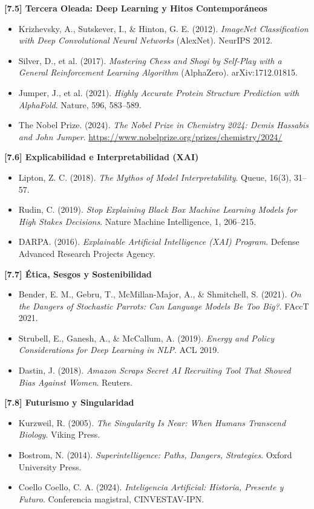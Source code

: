 \documentclass[12pt,a4paper]{report}
\numberwithin{figure}{section}
\begin{document}
\textbf{[7.5] Tercera Oleada: Deep Learning y Hitos Contemporáneos}
\begin{itemize}
  \item Krizhevsky, A., Sutskever, I., \& Hinton, G. E. (2012). \textit{ImageNet Classification with Deep Convolutional Neural Networks} (AlexNet). NeurIPS 2012.
  \item Silver, D., et al. (2017). \textit{Mastering Chess and Shogi by Self-Play with a General Reinforcement Learning Algorithm} (AlphaZero). arXiv:1712.01815.
  \item Jumper, J., et al. (2021). \textit{Highly Accurate Protein Structure Prediction with AlphaFold}. Nature, 596, 583--589.
  \item The Nobel Prize. (2024). \textit{The Nobel Prize in Chemistry 2024: Demis Hassabis and John Jumper}. \url{https://www.nobelprize.org/prizes/chemistry/2024/}
\end{itemize}

\textbf{[7.6] Explicabilidad e Interpretabilidad (XAI)}
\begin{itemize}
  \item Lipton, Z. C. (2018). \textit{The Mythos of Model Interpretability}. Queue, 16(3), 31--57.
  \item Rudin, C. (2019). \textit{Stop Explaining Black Box Machine Learning Models for High Stakes Decisions}. Nature Machine Intelligence, 1, 206--215.
  \item DARPA. (2016). \textit{Explainable Artificial Intelligence (XAI) Program}. Defense Advanced Research Projects Agency.
\end{itemize}

\textbf{[7.7] Ética, Sesgos y Sostenibilidad}
\begin{itemize}
  \item Bender, E. M., Gebru, T., McMillan-Major, A., \& Shmitchell, S. (2021). \textit{On the Dangers of Stochastic Parrots: Can Language Models Be Too Big?}. FAccT 2021.
  \item Strubell, E., Ganesh, A., \& McCallum, A. (2019). \textit{Energy and Policy Considerations for Deep Learning in NLP}. ACL 2019.
  \item Dastin, J. (2018). \textit{Amazon Scraps Secret AI Recruiting Tool That Showed Bias Against Women}. Reuters.
\end{itemize}

\textbf{[7.8] Futurismo y Singularidad}
\begin{itemize}
  \item Kurzweil, R. (2005). \textit{The Singularity Is Near: When Humans Transcend Biology}. Viking Press.
  \item Bostrom, N. (2014). \textit{Superintelligence: Paths, Dangers, Strategies}. Oxford University Press.
  \item Coello Coello, C. A. (2024). \textit{Inteligencia Artificial: Historia, Presente y Futuro}. Conferencia magistral, CINVESTAV-IPN.
\end{itemize}
\end{document}
